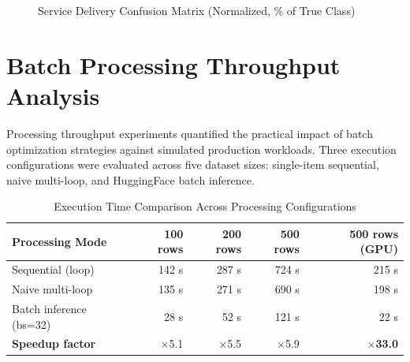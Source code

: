 \documentclass[12pt,a4paper]{report}
\begin{document}
\begin{figure}[H]
\centering
{}
\caption{Service Delivery Confusion Matrix (Normalized, \% of True Class)}
\label{fig:confmat}
\end{figure}

\section{Batch Processing Throughput Analysis}
Processing throughput experiments quantified the practical impact of batch optimization strategies against simulated production workloads. Three execution configurations were evaluated across five dataset sizes: single-item sequential, naive multi-loop, and HuggingFace batch inference.

\begin{table}[H]
\centering
\caption{Execution Time Comparison Across Processing Configurations}
\label{tab:throughput}
\begin{tabular}{@{}lrrrr@{}}
\toprule
\textbf{Processing Mode} & \textbf{100 rows} & \textbf{200 rows} & \textbf{500 rows} & \textbf{500 rows (GPU)} \\
\midrule
Sequential (loop)         & 142 s & 287 s & 724 s & 215 s \\
Naive multi-loop         & 135 s & 271 s & 690 s & 198 s \\
Batch inference (bs=32)  & 28 s  & 52 s  & 121 s & 22 s  \\
\midrule
\textbf{Speedup factor}  & $\times$5.1 & $\times$5.5 & $\times$5.9 & $\times$\textbf{33.0} \\
\bottomrule
\end{tabular}
\end{table}
\end{document}
